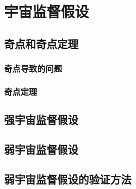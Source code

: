 	\chapter{宇宙监督假设}
	\section{奇点和奇点定理}
	\subsection{奇点导致的问题}
	\subsection{奇点定理}
	\section{强宇宙监督假设}
\section{弱宇宙监督假设}
\section{弱宇宙监督假设的验证方法}
